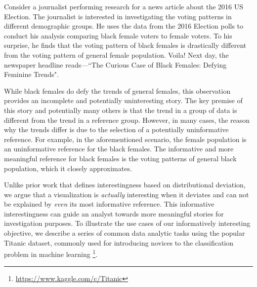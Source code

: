 \par Consider a journalist performing research for a news article about the 2016 US Election. The journalist is interested in investigating the voting patterns in different demographic groups. He uses the data from the 2016 Election polls to conduct his analysis comparing black female voters to female voters. To his surprise, he finds that the voting pattern of black females is drastically different from the voting pattern of general female population. Voila! Next day, the newspaper headline reads---``The Curious Case of Black Females: Defying Feminine Trends". 

While black females do defy the trends of general females, this observation provides an incomplete and potentially uninteresting story. The key premise of this story and potentially many others is that the trend in a group of data is different from the trend in a reference group. However, in many cases, the reason why the trends differ is due to the selection of a potentially uninformative reference. For example, in the aforementioned scenario, the female population is an uninformative reference for the black females. The informative and more meaningful reference for black females is the voting patterns of general black population, which it closely approximates.

Unlike prior work that defines interestingness based on distributional deviation, we argue that a visualization is \emph{actually} interesting when it deviates and can not be explained by \emph{even} its most informative reference. This informative interestingness can guide an analyst towards more meaningful stories for investigation purposes. To illustrate the use cases of our informatively interesting objective, we describe a series of common data analytic tasks using the popular Titanic dataset, commonly used for introducing novices to the classification problem in machine learning \footnote{\url{https://www.kaggle.com/c/Titanic}}.







